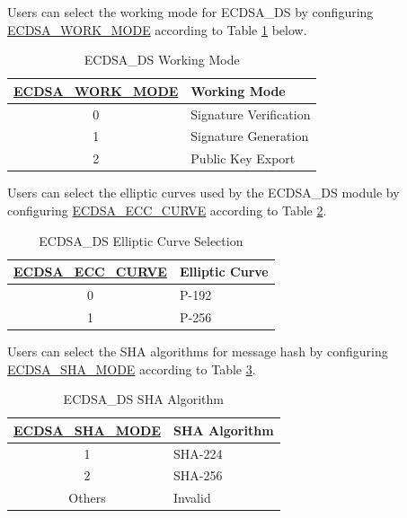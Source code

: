 \documentclass[main\_\_EN.tex]{subfiles}
\begin{document}
Users can select the working mode for ECDSA\_DS by configuring \hyperref[fielddesc:ECDSAWORKMODE]{ECDSA\_WORK\_MODE} according to Table \ref{tab:ecdsa-working-mode} below.

\begin{table}[H]
    \centering
    \caption{ECDSA\_DS Working Mode}
    \label{tab:ecdsa-working-mode}
    \begin{tabular}{ | c | l | }
    \hline
        \rowcolor{lightgray}
        \textbf{\hyperref[fielddesc:ECDSAWORKMODE]{ECDSA\_WORK\_MODE}}      & \textbf{Working Mode}\\\hline
        0                       & Signature Verification    \\\hline
        1                       & Signature Generation      \\\hline
        2                       & Public Key Export         \\\hline
    \end{tabular}
\end{table}

Users can select the elliptic curves used by the ECDSA\_DS module by configuring \hyperref[fielddesc:ECDSAECCCURVE]{ECDSA\_ECC\_CURVE} according to Table \ref{tab:ecdsa-curve-selection}.

\begin{table}[H]
    \centering
    \caption{ECDSA\_DS Elliptic Curve Selection}
    \label{tab:ecdsa-curve-selection}
    \begin{tabular}{ | c | l | }
    \hline
        \rowcolor{lightgray}
        \textbf{\hyperref[fielddesc:ECDSAECCCURVE]{ECDSA\_ECC\_CURVE}}      & \textbf{Elliptic Curve}\\
        \hline
        0                       & P-192    \\\hline
        1                       & P-256    \\\hline
    \end{tabular}
\end{table}

Users can select the SHA algorithms for message hash by configuring \hyperref[fielddesc:ECDSASHAMODE]{ECDSA\_SHA\_MODE} according to Table \ref{tab:ecdsa-sha-algorithms}.

\begin{table}[H]
    \centering
    \caption{ECDSA\_DS SHA Algorithm}
    \label{tab:ecdsa-sha-algorithms}
    \begin{tabular}{ | c | l | }
    \hline
        \rowcolor{lightgray}
        \textbf{\hyperref[fielddesc:ECDSASHAMODE]{ECDSA\_SHA\_MODE}}      & \textbf{SHA Algorithm}\\
        \hline
        1                       & SHA-224    \\\hline
        2                       & SHA-256    \\\hline
        Others                  & Invalid    \\\hline
    \end{tabular}
\end{table}
\end{document}
